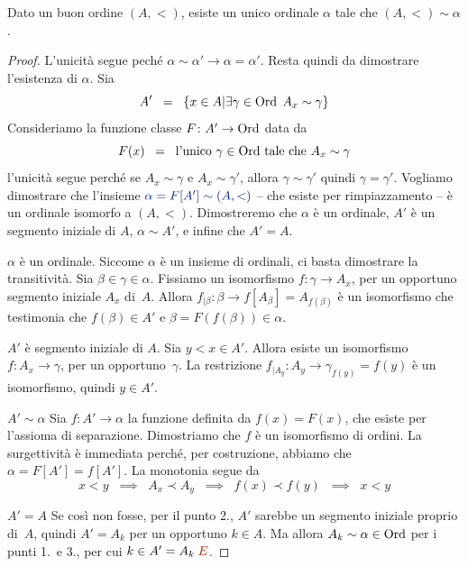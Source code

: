 \begin{theorem}
	Dato un buon ordine $(A,<)$, esiste un unico ordinale $\alpha$ tale che $(A,<)\sim\alpha$.
\end{theorem}

\begin{proof}
	L'unicit\`a segue pech\'e $\alpha \sim \alpha' \rightarrow \alpha
= \alpha'$. Resta quindi da dimostrare l'esistenza di $\alpha$. Sia
	\[ A' \;\;=\;\; \{x \in A | \exists\begingroup\gamma \in
\Ord\endgroup \; A_x \sim \gamma\}
		\]
	Consideriamo la funzione classe $F \colon A' \to \operatorname{Ord}$ data da
	\[ F(x) \;\;=\;\; \text{l'unico $\gamma \in \operatorname{Ord}$ tale che $A_x \sim \gamma$}
		\]
	l'unicit\`a segue perch\'e se $A_x\sim\gamma$ e $A_x\sim\gamma'$,
allora $\gamma\sim\gamma'$ quindi $\gamma=\gamma'$.
	Vogliamo dimostrare che l'insieme $\drkblu \alpha = F[A'] \sim (A,<)$ --
che esiste per rimpiazzamento -- \`e un ordinale isomorfo a $(A,<)$.
	Dimostreremo che $\alpha$ \`e un ordinale, $A'$ \`e un segmento iniziale di $A$, $\alpha \sim A'$, e infine che $A' = A$.

{\drkblu $\alpha$ \`e un ordinale.} Siccome $\alpha$ \`e un insieme di
ordinali, ci basta dimostrare la transitivit\`a.
		Sia $\beta \in \gamma \in \alpha$. Fissiamo un isomorfismo
$f \colon \gamma \to A_x$, per un opportuno segmento iniziale $A_x$
di~$A$. Allora $f_{|\beta} \colon \beta \to f[A_\beta] =
A_{f(\beta)}$ \`e un isomorfismo che testimonia che $f(\beta)\in A'$ e
$\beta=F(f(\beta))\in\alpha$.

{\drkblu $A'$ \`e segmento iniziale di $A$.} Sia $y < x \in A'$. Allora
esiste un isomorfismo $f \colon A_x \to \gamma$, per un
opportuno~$\gamma$. La restrizione $f_{|A_y}\colon A_y \to
\gamma_{f(y)}=f(y)$
\`e un isomorfismo, quindi $y\in A'$.

{\drkblu $A' \sim \alpha$} Sia $f \colon A' \to \alpha$ la funzione
definita da $f(x)=F(x)$, che esiste per l'assioma di separazione.
Dimostriamo che $f$ \`e un isomorfismo di ordini.
		La surgettivit\`a \`e immediata perch\'e, per costruzione,
abbiamo che $\alpha = F[A'] = f[A']$. La monotonia segue da
		\[ x < y \;\;\implies\;\; A_x \prec A_y \;\;\implies\;\; f(x) \prec f(y)
\;\;\implies\;\; x < y
			\]

{\drkblu $A' = A$} Se cos\`i non fosse, per il punto 2., $A'$ sarebbe un segmento iniziale
proprio di~$A$, quindi $A' = A_k$ per un opportuno $k \in A$. Ma allora
$A_k \sim \alpha \in \operatorname{Ord}$ per i punti 1.\ e 3., per cui $k \in A' = A_k
\;{\drkred\lightning}$.
\end{proof}

